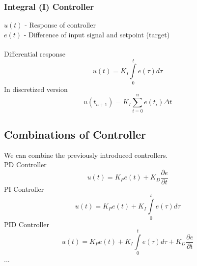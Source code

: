 \subsubsection{Integral (I) Controller}
\label{subsec:concepts-controller-types}
\begin{frame}{\insertsubsubsection}
	$u(t)$ - Response of controller\\
	$e(t)$ - Difference of input signal and setpoint (target)\\\\
	Differential response
	\begin{equation}
		u(t) = K_I \int\limits^t_0 e(\tau)d\tau
	\end{equation}
	In discretized version
	\begin{equation}
		u(t_{n+1}) = K_I \sum\limits_{i=0}^n e(t_i)\Delta t
	\end{equation}
\end{frame}
%
%
\subsection{Combinations of Controller}
\label{subsec:concepts-combinations}
\begin{frame}{\insertsubsection}
	We can combine the previously introduced controllers.\\
	PD Controller
	\begin{equation}
		u(t) = K_P e(t) + K_D \frac{\partial e}{\partial t}
	\end{equation}
	PI Controller
	\begin{equation}
		u(t) = K_P e(t) + K_I \int\limits^t_0 e(\tau)d\tau
	\end{equation}
	PID Controller
	\begin{equation}
		u(t) = K_P e(t) + K_I \int\limits^t_0 e(\tau)d\tau + K_D \frac{\partial e}{\partial t}
	\end{equation}
	...
\end{frame}
%
%
